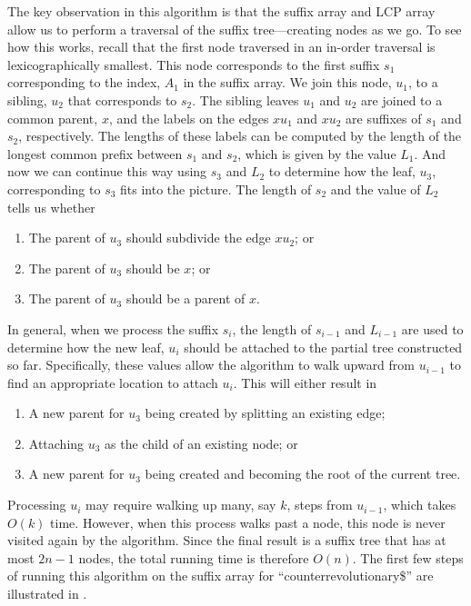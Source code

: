 The key observation in this algorithm is that the suffix array and LCP array allow us to perform a traversal of the suffix tree---creating nodes as we go.  To see how this works, recall that the first node traversed in an in-order traversal is lexicographically smallest.  This node corresponds to the first suffix $s_1$ corresponding to the index, $A_1$ in the suffix array.  We join this node, $u_1$, to a sibling, $u_2$ that corresponds to $s_2$.  The sibling leaves $u_1$ and $u_2$ are joined to a common parent, $x$, and the labels on the edges $xu_1$ and $xu_2$ are suffixes of $s_1$ and $s_2$, respectively.  The lengths of these labels can be computed by the length of the longest common prefix between $s_1$ and $s_2$, which is given by the value $L_1$.  And now we can continue this way using $s_3$ and $L_2$ to determine how the leaf, $u_3$, corresponding to $s_3$ fits into the picture.  The length of $s_2$ and the value of $L_2$ tells us whether 
\begin{enumerate}
  \item The parent of $u_3$ should subdivide the edge $xu_2$; or
  \item The parent of $u_3$ should be $x$; or
  \item The parent of $u_3$ should be a parent of $x$.
\end{enumerate}
In general, when we process the suffix $s_i$, the length of $s_{i-1}$ and $L_{i-1}$ are used to determine how the new leaf, $u_i$ should be attached to the partial tree constructed so far.  Specifically, these values allow the algorithm to walk upward from $u_{i-1}$ to find an appropriate location to attach $u_i$.  This will either result in 
\begin{enumerate}
  \item A new parent for $u_3$ being created by splitting an existing edge;
  \item Attaching $u_3$ as the child of an existing node; or
  \item A new parent for $u_3$ being created and becoming the root of the current tree.
\end{enumerate}
Processing $u_i$ may require walking up many, say $k$, steps from $u_{i-1}$, 
which takes $O(k)$ time. However, when this process walks past a node, this node is never visited again by the algorithm. Since the final result is a suffix tree that has at most $2n-1$ nodes, the total running time is therefore $O(n)$. The first few steps of running this algorithm on the suffix array for ``counterrevolutionary\$'' are illustrated in .

